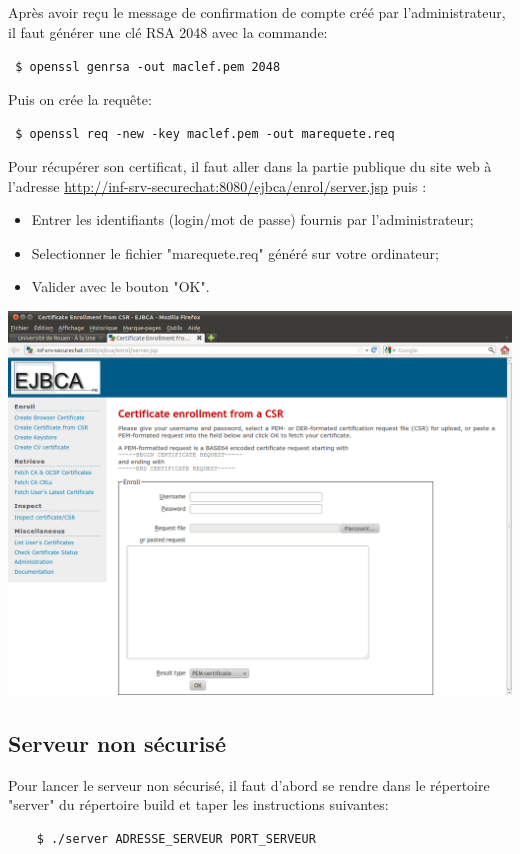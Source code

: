 \documentclass[a4paper,11pt,french]{book}
\begin{document}
Après avoir reçu le message de confirmation de compte créé par l'administrateur, il faut générer une clé RSA 2048 avec la commande:

\verb+ $ openssl genrsa -out maclef.pem 2048+

Puis on crée la requête:

\verb+ $ openssl req -new -key maclef.pem -out marequete.req+

Pour récupérer son certificat, il faut aller dans la partie publique du site web à l'adresse \url{http://inf-srv-securechat:8080/ejbca/enrol/server.jsp} puis :
\begin{itemize}
\item Entrer les identifiants (login/mot de passe) fournis par l'administrateur;
\item Selectionner le fichier "marequete.req" généré sur votre ordinateur;
\item Valider avec le bouton "OK".
\end{itemize}

\newpage
\includegraphics[scale=0.35]{capture/ejbca_cert.png}
\subsection{Serveur non sécurisé}
Pour lancer le serveur non sécurisé, il faut d'abord se rendre dans le répertoire "server" du répertoire build et taper les instructions suivantes:

\begin{verbatim}
    $ ./server ADRESSE_SERVEUR PORT_SERVEUR
\end{verbatim}
\end{document}
